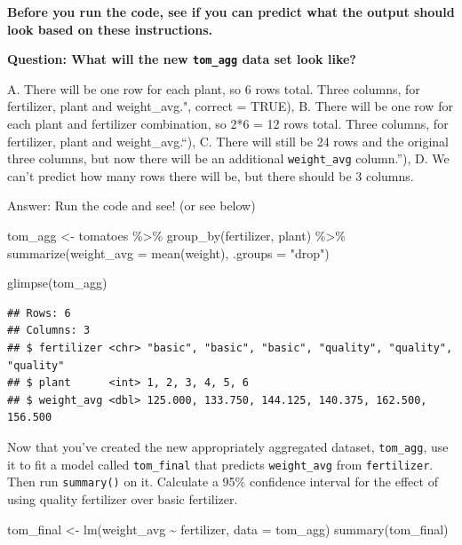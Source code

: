 \documentclass[
  openany]{book}
\newenvironment{Shaded}{\begin{snugshade}}{\end{snugshade}}
\newcommand{\AttributeTok}[1]{\textcolor[rgb]{0.77,0.63,0.00}{#1}}
\newcommand{\FunctionTok}[1]{\textcolor[rgb]{0.00,0.00,0.00}{#1}}
\newcommand{\NormalTok}[1]{#1}
\newcommand{\OtherTok}[1]{\textcolor[rgb]{0.56,0.35,0.01}{#1}}
\newcommand{\SpecialCharTok}[1]{\textcolor[rgb]{0.00,0.00,0.00}{#1}}
\newcommand{\StringTok}[1]{\textcolor[rgb]{0.31,0.60,0.02}{#1}}
\begin{document}
\textbf{Before you run the code, see if you can predict what the output should look based on these instructions.}

\textbf{Question: What will the new \texttt{tom\_agg} data set look like?}

A. There will be one row for each plant, so 6 rows total. Three columns, for fertilizer, plant and weight\_avg.", correct = TRUE),
B. There will be one row for each plant and fertilizer combination, so 2*6 = 12 rows total. Three columns, for fertilizer, plant and weight\_avg.``),
C. There will still be 24 rows and the original three columns, but now there will be an additional \texttt{weight\_avg} column.''),
D. We can't predict how many rows there will be, but there should be 3 columns.

Answer: Run the code and see! (or see below)

\begin{Shaded}
\begin{Highlighting}[]
\NormalTok{tom\_agg }\OtherTok{\textless{}{-}}\NormalTok{ tomatoes }\SpecialCharTok{\%\textgreater{}\%} 
  \FunctionTok{group\_by}\NormalTok{(fertilizer, plant) }\SpecialCharTok{\%\textgreater{}\%} 
  \FunctionTok{summarize}\NormalTok{(}\AttributeTok{weight\_avg =} \FunctionTok{mean}\NormalTok{(weight), }\AttributeTok{.groups =} \StringTok{"drop"}\NormalTok{)}

\FunctionTok{glimpse}\NormalTok{(tom\_agg)}
\end{Highlighting}
\end{Shaded}

\begin{verbatim}
## Rows: 6
## Columns: 3
## $ fertilizer <chr> "basic", "basic", "basic", "quality", "quality", "quality"
## $ plant      <int> 1, 2, 3, 4, 5, 6
## $ weight_avg <dbl> 125.000, 133.750, 144.125, 140.375, 162.500, 156.500
\end{verbatim}

Now that you've created the new appropriately aggregated dataset, \texttt{tom\_agg}, use it to fit a model called \texttt{tom\_final} that predicts \texttt{weight\_avg} from \texttt{fertilizer}. Then run \texttt{summary()} on it. Calculate a 95\% confidence interval for the effect of using quality fertilizer over basic fertilizer.

\begin{Shaded}
\begin{Highlighting}[]
\NormalTok{tom\_final }\OtherTok{\textless{}{-}} \FunctionTok{lm}\NormalTok{(weight\_avg }\SpecialCharTok{\textasciitilde{}}\NormalTok{ fertilizer, }\AttributeTok{data =}\NormalTok{ tom\_agg)}
\FunctionTok{summary}\NormalTok{(tom\_final)}
\end{Highlighting}
\end{Shaded}
\end{document}
